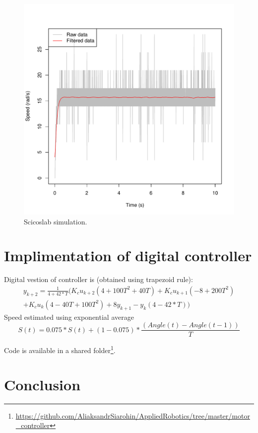 \documentclass[a4paper,12pt,oneside]{article}
\begin{document}
\begin{figure}[t]
	\centering
	\includegraphics[width=\columnwidth]{../motor_data/plots/filtering/90}
	\caption{Scicoslab simulation.}
	\label{fig:simulation}
\end{figure}

\section{Implimentation of digital controller}
Digital vestion of controller is (obtained using trapezoid rule):
\begin{multline}
y_{k+2} = \frac{1}{4 + 42 * T} (K_cu_{k+2}(4 + 100T^2 + 40T) + K_cu_{k+1}(-8 + 200T^2) \\+ K_cu_{k}(4 - 40T + 100T^2) + 8y_{k+1} - y_{k}(4 - 42*T))
\end{multline}
Speed estimated using exponential average
\begin{equation}
S(t) = 0.075 * S(t) + (1 - 0.075) * \frac{(Angle(t) - Angle(t-1))}{T}
\end{equation}

Code is available in a shared folder\footnote{\url{https://github.com/AliaksandrSiarohin/AppliedRobotics/tree/master/motor_controller}}.

\section{Conclusion}
\end{document}
